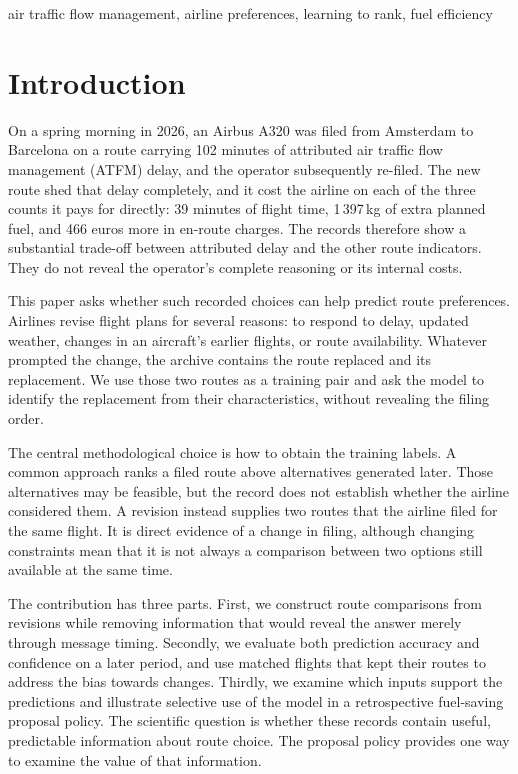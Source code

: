\documentclass[a4paper,conference]{IEEEtran}
\begin{document}
\begin{IEEEkeywords}
air traffic flow management, airline preferences, learning to rank,
fuel efficiency
\end{IEEEkeywords}

\section{Introduction}
\label{sec:intro}

On a spring morning in 2026, an Airbus A320 was filed from Amsterdam to
Barcelona on a route carrying 102 minutes of attributed air traffic flow
management (ATFM) delay, and the operator subsequently re-filed. The new
route shed that delay completely, and it cost the airline on each of the
three counts it pays for directly: 39 minutes of flight time,
1\,397\,kg of extra planned fuel, and 466 euros more in en-route charges.
The records therefore show a substantial trade-off between attributed
delay and the other route indicators. They do not reveal the operator's
complete reasoning or its internal costs.

This paper asks whether such recorded choices can help predict route
preferences. Airlines revise flight plans for several reasons: to respond
to delay, updated weather, changes in an aircraft's earlier flights, or
route availability. Whatever prompted the change, the archive contains
the route replaced and its replacement. We use those two routes as a
training pair and ask the model to identify the replacement from their
characteristics, without revealing the filing order.

The central methodological choice is how to obtain the training labels.
A common approach ranks a filed route above alternatives generated later.
Those alternatives may be feasible, but the record does not establish
whether the airline considered them. A revision instead supplies two
routes that the airline filed for the same flight. It is direct evidence
of a change in filing, although changing constraints mean that it is not
always a comparison between two options still available at the same time.

The contribution has three parts. First, we construct route comparisons
from revisions while removing information that would reveal the answer
merely through message timing. Secondly, we evaluate both prediction
accuracy and confidence on a later period, and use matched flights that
kept their routes to address the bias towards changes. Thirdly, we examine
which inputs support the predictions and illustrate selective use of the
model in a retrospective fuel-saving proposal policy. The scientific
question is whether these records contain useful, predictable information
about route choice. The proposal policy provides one way to examine the
value of that information.
\end{document}
